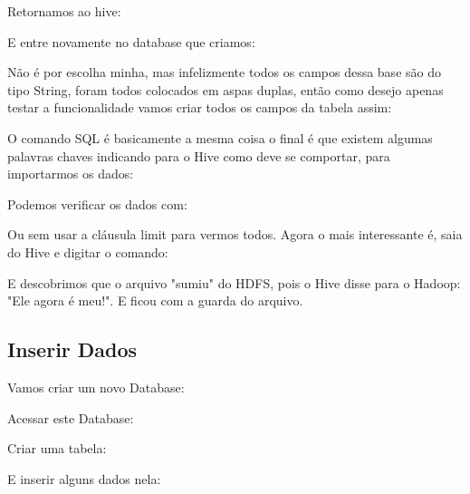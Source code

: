 \documentclass[a4paper,11pt]{article}
\begin{document}
Retornamos ao hive: \\

E entre novamente no database que criamos: \\

Não é por escolha minha, mas infelizmente todos os campos dessa base são do tipo String, foram todos colocados em aspas duplas, então como desejo apenas testar a funcionalidade vamos criar todos os campos da tabela assim: \\

O comando SQL é basicamente a mesma coisa o final é que existem algumas palavras chaves indicando para o Hive como deve se comportar, para importarmos os dados: \\

Podemos verificar os dados com: \\

Ou sem usar a cláusula limit para vermos todos. Agora o mais interessante é, saia do Hive e digitar o comando: \\

E descobrimos que o arquivo "sumiu" do HDFS, pois o Hive disse para o Hadoop: "Ele agora é meu!". E ficou com a guarda do arquivo.

\subsection{Inserir Dados}
Vamos criar um novo Database: \\

Acessar este Database: \\

Criar uma tabela: \\

E inserir alguns dados nela: \\
\end{document}
